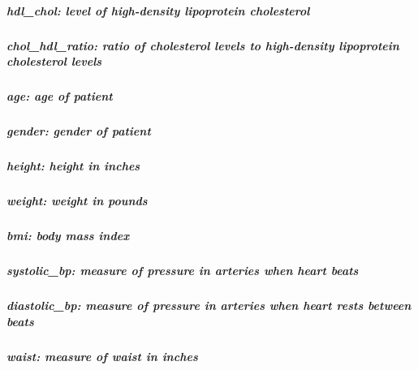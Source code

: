\documentclass[
]{article}
\begin{document}
\hypertarget{hdl_chol-level-of-high-density-lipoprotein-cholesterol}{%
\subparagraph{\texorpdfstring{\textbf{hdl\_chol}: level of high-density
lipoprotein
cholesterol}{hdl\_chol: level of high-density lipoprotein cholesterol}}\label{hdl_chol-level-of-high-density-lipoprotein-cholesterol}}

\hypertarget{chol_hdl_ratio-ratio-of-cholesterol-levels-to-high-density-lipoprotein-cholesterol-levels}{%
\subparagraph{\texorpdfstring{\textbf{chol\_hdl\_ratio}: ratio of
cholesterol levels to high-density lipoprotein cholesterol
levels}{chol\_hdl\_ratio: ratio of cholesterol levels to high-density lipoprotein cholesterol levels}}\label{chol_hdl_ratio-ratio-of-cholesterol-levels-to-high-density-lipoprotein-cholesterol-levels}}

\hypertarget{age-age-of-patient}{%
\subparagraph{\texorpdfstring{\textbf{age}: age of
patient}{age: age of patient}}\label{age-age-of-patient}}

\hypertarget{gender-gender-of-patient}{%
\subparagraph{\texorpdfstring{\textbf{gender}: gender of
patient}{gender: gender of patient}}\label{gender-gender-of-patient}}

\hypertarget{height-height-in-inches}{%
\subparagraph{\texorpdfstring{\textbf{height}: height in
inches}{height: height in inches}}\label{height-height-in-inches}}

\hypertarget{weight-weight-in-pounds}{%
\subparagraph{\texorpdfstring{\textbf{weight}: weight in
pounds}{weight: weight in pounds}}\label{weight-weight-in-pounds}}

\hypertarget{bmi-body-mass-index}{%
\subparagraph{\texorpdfstring{\textbf{bmi}: body mass
index}{bmi: body mass index}}\label{bmi-body-mass-index}}

\hypertarget{systolic_bp-measure-of-pressure-in-arteries-when-heart-beats}{%
\subparagraph{\texorpdfstring{\textbf{systolic\_bp}: measure of pressure
in arteries when heart
beats}{systolic\_bp: measure of pressure in arteries when heart beats}}\label{systolic_bp-measure-of-pressure-in-arteries-when-heart-beats}}

\hypertarget{diastolic_bp-measure-of-pressure-in-arteries-when-heart-rests-between-beats}{%
\subparagraph{\texorpdfstring{\textbf{diastolic\_bp}: measure of
pressure in arteries when heart rests between
beats}{diastolic\_bp: measure of pressure in arteries when heart rests between beats}}\label{diastolic_bp-measure-of-pressure-in-arteries-when-heart-rests-between-beats}}

\hypertarget{waist-measure-of-waist-in-inches}{%
\subparagraph{\texorpdfstring{\textbf{waist}: measure of waist in
inches}{waist: measure of waist in inches}}\label{waist-measure-of-waist-in-inches}}
\end{document}
